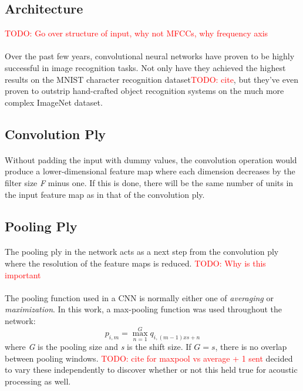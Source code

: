 \documentclass[letterpaper]{article}
\newcommand{\TODO}[1]{\textcolor{red}{TODO: #1}}
\begin{document}
\subsection*{Architecture}

\TODO{Go over structure of input, why not MFCCs, why frequency axis}

\paragraph{} Over the past few years, convolutional neural networks have proven to be highly successful in image recognition tasks. Not only have they achieved the highest results on the MNIST character recognition dataset\TODO{cite}, but they've even proven to outstrip hand-crafted object recognition systems on the much more complex ImageNet dataset.

\subsection*{Convolution Ply}


\paragraph{}Without padding the input with dummy values, the convolution operation would produce a lower-dimensional feature map where each dimension decreases by the filter size \textit{F} minus one. If this is done, there will be the same number of units in the input feature map as in that of the convolution ply.


\subsection*{Pooling Ply}

\paragraph{}The pooling ply in the network acts as a next step from the convolution ply where the resolution of the feature maps is reduced. \TODO{Why is this important}

\paragraph{}The pooling function used in a CNN is normally either one of \textit{averaging} or \textit{maximization}. In this work, a max-pooling function was used throughout the network:
\begin{equation*}
p_{i,m} = \max_{n=1}^{G} q_{i, (m-1)xs+n}
\end{equation*}
where \textit{G} is the pooling size and \textit{s} is the shift size. If $G=s$, there is no overlap between pooling windows. \TODO{cite for maxpool vs average + 1 sent} \cite{DBLP:journals/taslp/Abdel-HamidMJDPY14} decided to vary these independently to discover whether or not this held true for acoustic processing as well. 
\end{document}

